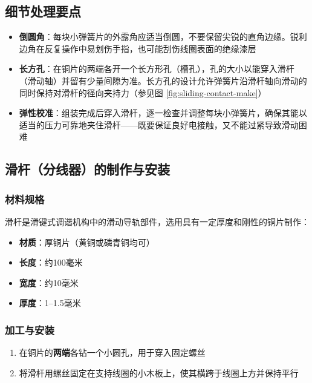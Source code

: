 \documentclass[12pt,UTF8]{ctexbook}
\begin{document}
\subsection{细节处理要点}

\begin{itemize}
	\item \textbf{倒圆角}：每块小弹簧片的外露角应适当倒圆，不要保留尖锐的直角边缘。锐利边角在反复操作中易划伤手指，也可能刮伤线圈表面的绝缘漆层
	\item \textbf{长方孔}：在铜片的两端各开一个长方形孔（槽孔），孔的大小以能穿入滑杆（滑动轴）并留有少量间隙为准。长方孔的设计允许弹簧片沿滑杆轴向滑动的同时保持对滑杆的径向夹持力（参见图 \ref{fig:sliding-contact-make}）
	\item \textbf{弹性校准}：组装完成后穿入滑杆，逐一检查并调整每块小弹簧片，确保其能以适当的压力可靠地夹住滑杆——既要保证良好电接触，又不能过紧导致滑动困难
\end{itemize}

\subsection{滑杆（分线器）的制作与安装}

\subsubsection{材料规格}

滑杆是滑键式调谐机构中的滑动导轨部件，选用具有一定厚度和刚性的铜片制作：

\begin{itemize}
	\item \textbf{材质}：厚铜片（黄铜或磷青铜均可）
	\item \textbf{长度}：约100毫米
	\item \textbf{宽度}：约10毫米
	\item \textbf{厚度}：1--1.5毫米
\end{itemize}

\subsubsection{加工与安装}

\begin{enumerate}
	\item 在铜片的\textbf{两端}各钻一个小圆孔，用于穿入固定螺丝
	\item 将滑杆用螺丝固定在支持线圈的小木板上，使其横跨于线圈上方并保持平行
\end{enumerate}
\end{document}
